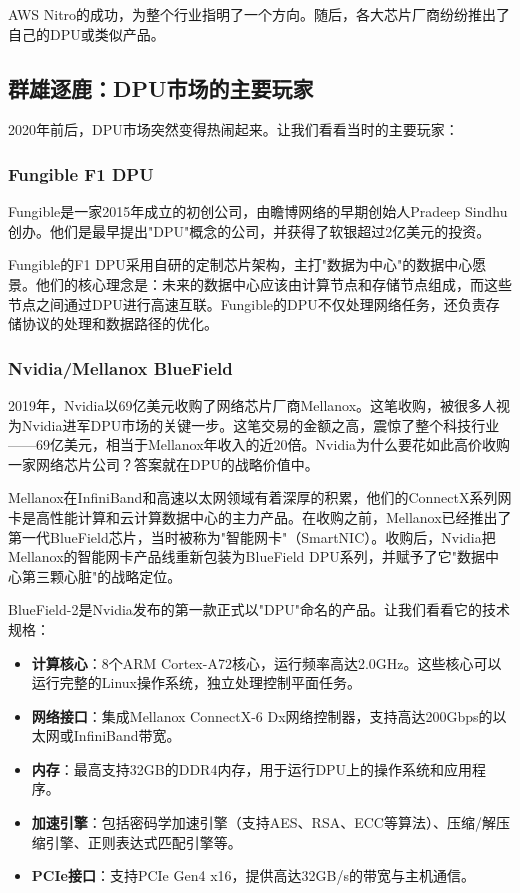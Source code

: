 AWS Nitro的成功，为整个行业指明了一个方向。随后，各大芯片厂商纷纷推出了自己的DPU或类似产品。

\subsection{群雄逐鹿：DPU市场的主要玩家}

2020年前后，DPU市场突然变得热闹起来。让我们看看当时的主要玩家：

\subsubsection{Fungible F1 DPU}

Fungible是一家2015年成立的初创公司，由瞻博网络的早期创始人Pradeep Sindhu创办。他们是最早提出"DPU"概念的公司，并获得了软银超过2亿美元的投资。

Fungible的F1 DPU采用自研的定制芯片架构，主打"数据为中心"的数据中心愿景。他们的核心理念是：未来的数据中心应该由计算节点和存储节点组成，而这些节点之间通过DPU进行高速互联。Fungible的DPU不仅处理网络任务，还负责存储协议的处理和数据路径的优化。

\subsubsection{Nvidia/Mellanox BlueField}

2019年，Nvidia以69亿美元收购了网络芯片厂商Mellanox。这笔收购，被很多人视为Nvidia进军DPU市场的关键一步。这笔交易的金额之高，震惊了整个科技行业——69亿美元，相当于Mellanox年收入的近20倍。Nvidia为什么要花如此高价收购一家网络芯片公司？答案就在DPU的战略价值中。

Mellanox在InfiniBand和高速以太网领域有着深厚的积累，他们的ConnectX系列网卡是高性能计算和云计算数据中心的主力产品。在收购之前，Mellanox已经推出了第一代BlueField芯片，当时被称为"智能网卡"（SmartNIC）。收购后，Nvidia把Mellanox的智能网卡产品线重新包装为BlueField DPU系列，并赋予了它"数据中心第三颗心脏"的战略定位。

BlueField-2是Nvidia发布的第一款正式以"DPU"命名的产品。让我们看看它的技术规格：

\begin{itemize}
    \item \textbf{计算核心}：8个ARM Cortex-A72核心，运行频率高达2.0GHz。这些核心可以运行完整的Linux操作系统，独立处理控制平面任务。
    \item \textbf{网络接口}：集成Mellanox ConnectX-6 Dx网络控制器，支持高达200Gbps的以太网或InfiniBand带宽。
    \item \textbf{内存}：最高支持32GB的DDR4内存，用于运行DPU上的操作系统和应用程序。
    \item \textbf{加速引擎}：包括密码学加速引擎（支持AES、RSA、ECC等算法）、压缩/解压缩引擎、正则表达式匹配引擎等。
    \item \textbf{PCIe接口}：支持PCIe Gen4 x16，提供高达32GB/s的带宽与主机通信。
\end{itemize}


